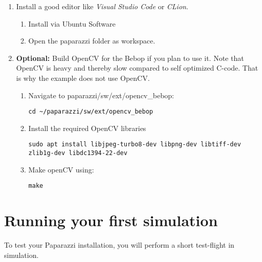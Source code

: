 \begin{enumerate}
	\item Install a good editor like \textsl{Visual Studio Code} or \textsl{CLion}.
		
	\begin{enumerate}
		\item{Install via Ubuntu Software}
		\item{Open the paparazzi folder as workspace.}
	\end{enumerate}
	
	\item \textbf{Optional:} Build OpenCV for the Bebop if you plan to use it. Note that OpenCV is heavy and thereby slow compared to self
	optimized C-code. That is why the example does not use OpenCV.

	\begin{enumerate}
		\item Navigate to paparazzi/sw/ext/opencv\_bebop:
		\begin{lstlisting}[style=Bash]
			cd ~/paparazzi/sw/ext/opencv_bebop
		\end{lstlisting}
		\item Install the required OpenCV libraries
		\begin{lstlisting}[style=Bash]
			sudo apt install libjpeg-turbo8-dev libpng-dev libtiff-dev zlib1g-dev libdc1394-22-dev
		\end{lstlisting}
		\item Make openCV using:
		\begin{lstlisting}[style=Bash]
			make
		\end{lstlisting}
	\end{enumerate}

\end{enumerate}


\section{Running your first simulation}

To test your Paparazzi installation, you will perform a short test-flight in simulation.

